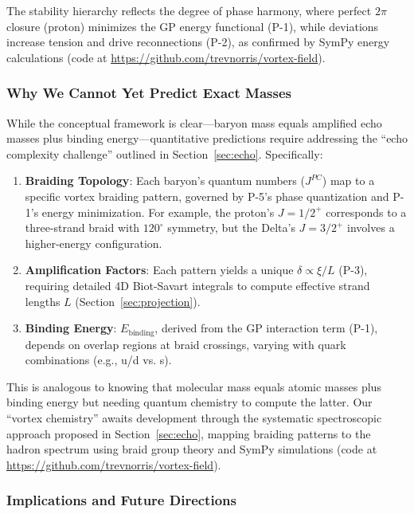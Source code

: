 The stability hierarchy reflects the degree of phase harmony, where perfect $2\pi$ closure (proton) minimizes the GP energy functional (P-1), while deviations increase tension and drive reconnections (P-2), as confirmed by SymPy energy calculations (code at \url{https://github.com/trevnorris/vortex-field}).

\subsubsection{Why We Cannot Yet Predict Exact Masses}

While the conceptual framework is clear—baryon mass equals amplified echo masses plus binding energy—quantitative predictions require addressing the ``echo complexity challenge'' outlined in Section~\ref{sec:echo}. Specifically:

\begin{enumerate}
\item \textbf{Braiding Topology}: Each baryon's quantum numbers ($J^{PC}$) map to a specific vortex braiding pattern, governed by P-5's phase quantization and P-1's energy minimization. For example, the proton's $J=1/2^+$ corresponds to a three-strand braid with $120^\circ$ symmetry, but the Delta's $J=3/2^+$ involves a higher-energy configuration.
\item \textbf{Amplification Factors}: Each pattern yields a unique $\delta \propto \xi/L$ (P-3), requiring detailed 4D Biot-Savart integrals to compute effective strand lengths $L$ (Section~\ref{sec:projection}).
\item \textbf{Binding Energy}: $E_{\text{binding}}$, derived from the GP interaction term (P-1), depends on overlap regions at braid crossings, varying with quark combinations (e.g., u/d vs. s).
\end{enumerate}

This is analogous to knowing that molecular mass equals atomic masses plus binding energy but needing quantum chemistry to compute the latter. Our ``vortex chemistry'' awaits development through the systematic spectroscopic approach proposed in Section~\ref{sec:echo}, mapping braiding patterns to the hadron spectrum using braid group theory and SymPy simulations (code at \url{https://github.com/trevnorris/vortex-field}).

\subsubsection{Implications and Future Directions}


